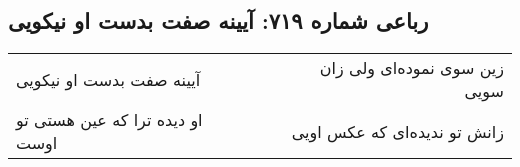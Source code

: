 \begin{center}
\section*{رباعی شماره ۷۱۹: آیینه صفت بدست او نیکویی}
\label{sec:sh719}
\begin{longtable}{l p{0.5cm} r}
آیینه صفت بدست او نیکویی
&&
زین سوی نموده‌ای ولی زان سویی
\\
او دیده ترا که عین هستی تو اوست
&&
زانش تو ندیده‌ای که عکس اویی
\\
\end{longtable}
\end{center}
